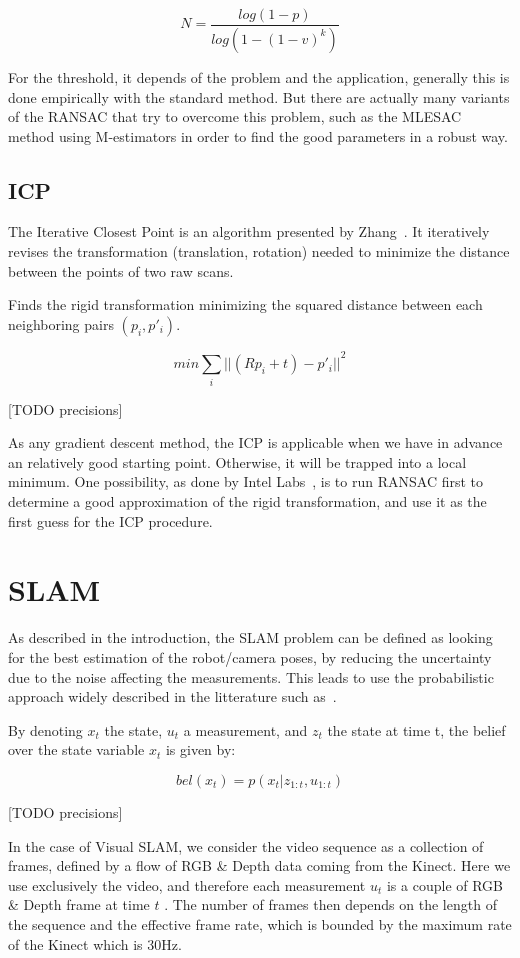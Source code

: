 \[
N = \frac{log(1-p)}{log(1-(1-v)^k)}
\]

For the threshold, it depends of the problem and the application, generally this is done empirically with the standard method. But there are actually many variants of the RANSAC that try to overcome this problem, such as the MLESAC method \cite{TorrZ00} using M-estimators in order to find the good parameters in a robust way.


\subsection{ICP}

The Iterative Closest Point is an algorithm presented by Zhang~\cite{zhang_92_icp}.
It iteratively revises the transformation (translation, rotation) needed to minimize the distance between the points of two raw scans.

Finds the rigid transformation minimizing the squared distance between each neighboring pairs $(p_{i}, p'_{i})$.

\[min \sum_{i}{||(Rp_{i}+t)-p'_{i}||}^2\]

[TODO precisions]

As any gradient descent method, the ICP is applicable when we have in advance an relatively good starting point. Otherwise, it will be trapped into a local minimum. One possibility, as done by Intel Labs~\cite{Intel_RGBD_2010}, is to run RANSAC first to determine a good approximation of the rigid transformation, and use it as the first guess for the ICP procedure.

\section{SLAM}

As described in the introduction, the SLAM problem can be defined as looking for the best estimation of the robot/camera poses, by reducing the uncertainty due to the noise affecting the measurements. This leads to use the probabilistic approach widely described in the litterature such as~\cite{Thrun_2005}.

By denoting $x_t$ the state, $u_t$ a measurement, and $z_t$ the state at time t, the belief over the state variable $x_t$ is given by:

\[bel(x_t) = p(x_t | z_{1:t}, u_{1:t})\]

[TODO precisions]

In the case of Visual SLAM, we consider the video sequence as a collection of frames, defined by a flow of RGB \& Depth data coming from the Kinect. Here we use exclusively the video, and therefore each measurement $u_t$ is a couple of RGB \& Depth frame at time $t$ . The number of frames then depends on the length of the sequence and the effective frame rate, which is bounded by the maximum rate of the Kinect which is 30Hz.


